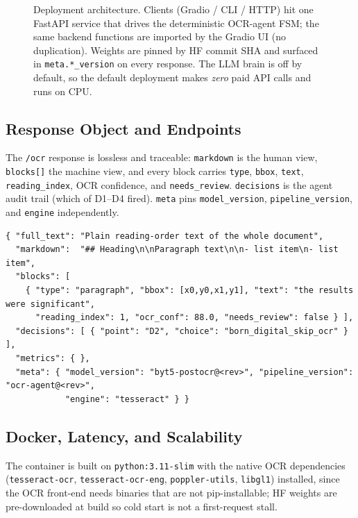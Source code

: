 \documentclass[12pt,a4paper]{article}
\begin{document}
\begin{figure}[H]
{%
}
\caption{Deployment architecture. Clients (Gradio / CLI / HTTP) hit one FastAPI service that drives the deterministic OCR-agent FSM; the same backend functions are imported by the Gradio UI (no duplication). Weights are pinned by HF commit SHA and surfaced in \texttt{meta.*\_version} on every response. The LLM brain is off by default, so the default deployment makes \emph{zero} paid API calls and runs on CPU.}
\label{fig:arch}
\end{figure}

\subsection{Response Object and Endpoints}

The \texttt{/ocr} response is lossless and traceable: \texttt{markdown} is the human view, \texttt{blocks[]} the machine view, and every block carries \texttt{type}, \texttt{bbox}, \texttt{text}, \texttt{reading\_index}, OCR confidence, and \texttt{needs\_review}. \texttt{decisions} is the agent audit trail (which of D1--D4 fired). \texttt{meta} pins \texttt{model\_version}, \texttt{pipeline\_version}, and \texttt{engine} independently.

\begin{lstlisting}[basicstyle=\ttfamily\footnotesize]
{ "full_text": "Plain reading-order text of the whole document",
  "markdown":  "## Heading\n\nParagraph text\n\n- list item\n- list item",
  "blocks": [
    { "type": "paragraph", "bbox": [x0,y0,x1,y1], "text": "the results were significant",
      "reading_index": 1, "ocr_conf": 88.0, "needs_review": false } ],
  "decisions": [ { "point": "D2", "choice": "born_digital_skip_ocr" } ],
  "metrics": { },
  "meta": { "model_version": "byt5-postocr@<rev>", "pipeline_version": "ocr-agent@<rev>",
            "engine": "tesseract" } }
\end{lstlisting}

\subsection{Docker, Latency, and Scalability}

The container is built on \texttt{python:3.11-slim} with the native OCR dependencies (\texttt{tesseract-ocr}, \texttt{tesseract-ocr-eng}, \texttt{poppler-utils}, \texttt{libgl1}) installed, since the OCR front-end needs binaries that are not pip-installable; HF weights are pre-downloaded at build so cold start is not a first-request stall.
\end{document}
